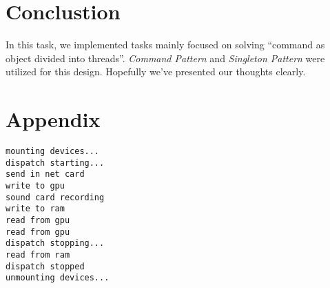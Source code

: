 \documentclass[a4paper]{article}
\begin{document}
\section{Conclustion}%
\label{sec:conclustion}

In this task, we implemented tasks mainly focused on solving ``command as object divided into threads''.
\textit{Command Pattern} and \textit{Singleton Pattern} were utilized for this design. Hopefully we've presented
our thoughts clearly.

\section{Appendix}%
\label{sec:appendix}

\begin{lstlisting}
mounting devices...
dispatch starting...
send in net card
write to gpu
sound card recording
write to ram
read from gpu
read from gpu
dispatch stopping...
read from ram
dispatch stopped
unmounting devices...
\end{lstlisting}
\end{document}
